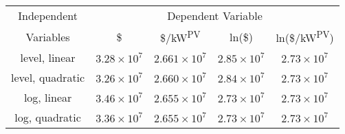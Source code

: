 \begin{tabular}{|c|cccc|}\hline
Independent & \multicolumn{4}{c|}{Dependent Variable}  \\ \cline{2-5}
Variables &  \$  \Tstrut  &  \$/kW\textsuperscript{PV}  & ln(\$) & ln(\$/kW\textsuperscript{PV})  \\\hline
level, linear     &   $3.28 \times 10^7 $    &  $2.661 \times 10^7$  & $2.85 \times 10^7$  &   $2.73 \times 10^7$  \\
level, quadratic     &   $3.26 \times 10^7 $    &  $2.660 \times 10^7$  & $2.84 \times 10^7$  &   $2.73 \times 10^7$  \\
log, linear   &   $3.46 \times 10^7 $  &    $2.655 \times 10^7$  & $2.73 \times 10^7$ & $2.73 \times 10^7$   \\
log, quadratic  & $3.36 \times 10^7 $  &    $2.655 \times 10^7$  & $2.73 \times 10^7$ & $2.73 \times 10^7$   \\\hline
\end{tabular}
